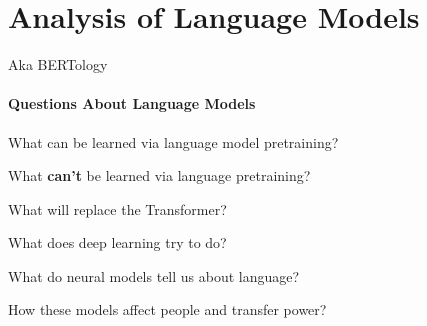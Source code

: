 \documentclass[10pt]{report}
\begin{document}
\section{Analysis of Language Models}
Aka BERTology
\paragraph{Questions About Language Models} \begin{list}{}{}
	\item What can be learned via language model pretraining?
	\item What \textbf{can't} be learned via language pretraining?
	\item What will replace the Transformer?
	\item What does deep learning try to do?
	\item What do neural models tell us about language?
	\item How these models affect people and transfer power? 
\end{list}
\end{document}
